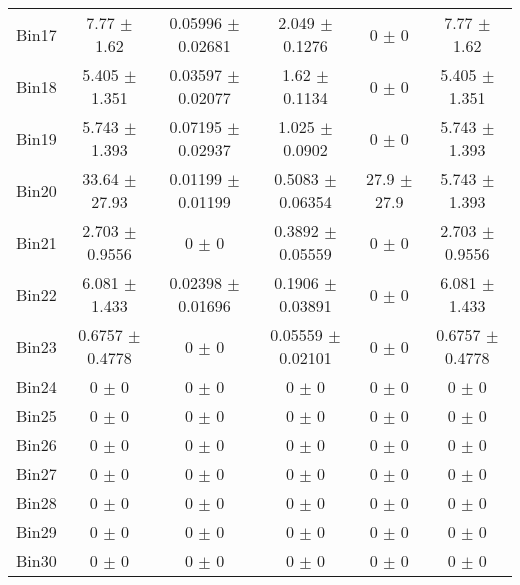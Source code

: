 \begin{tabular}{@{\extracolsep{4pt}}lccccc@{}}
     Bin17 & 7.77 $\pm$ 1.62 & 0.05996 $\pm$ 0.02681 & 2.049 $\pm$ 0.1276 & 0 $\pm$ 0 & 7.77 $\pm$ 1.62 \\ 
     Bin18 & 5.405 $\pm$ 1.351 & 0.03597 $\pm$ 0.02077 & 1.62 $\pm$ 0.1134 & 0 $\pm$ 0 & 5.405 $\pm$ 1.351 \\ 
     Bin19 & 5.743 $\pm$ 1.393 & 0.07195 $\pm$ 0.02937 & 1.025 $\pm$ 0.0902 & 0 $\pm$ 0 & 5.743 $\pm$ 1.393 \\ 
     Bin20 & 33.64 $\pm$ 27.93 & 0.01199 $\pm$ 0.01199 & 0.5083 $\pm$ 0.06354 & 27.9 $\pm$ 27.9 & 5.743 $\pm$ 1.393 \\ 
     Bin21 & 2.703 $\pm$ 0.9556 & 0 $\pm$ 0 & 0.3892 $\pm$ 0.05559 & 0 $\pm$ 0 & 2.703 $\pm$ 0.9556 \\ 
     Bin22 & 6.081 $\pm$ 1.433 & 0.02398 $\pm$ 0.01696 & 0.1906 $\pm$ 0.03891 & 0 $\pm$ 0 & 6.081 $\pm$ 1.433 \\ 
     Bin23 & 0.6757 $\pm$ 0.4778 & 0 $\pm$ 0 & 0.05559 $\pm$ 0.02101 & 0 $\pm$ 0 & 0.6757 $\pm$ 0.4778 \\ 
     Bin24 & 0 $\pm$ 0 & 0 $\pm$ 0 & 0 $\pm$ 0 & 0 $\pm$ 0 & 0 $\pm$ 0 \\ 
     Bin25 & 0 $\pm$ 0 & 0 $\pm$ 0 & 0 $\pm$ 0 & 0 $\pm$ 0 & 0 $\pm$ 0 \\ 
     Bin26 & 0 $\pm$ 0 & 0 $\pm$ 0 & 0 $\pm$ 0 & 0 $\pm$ 0 & 0 $\pm$ 0 \\ 
     Bin27 & 0 $\pm$ 0 & 0 $\pm$ 0 & 0 $\pm$ 0 & 0 $\pm$ 0 & 0 $\pm$ 0 \\ 
     Bin28 & 0 $\pm$ 0 & 0 $\pm$ 0 & 0 $\pm$ 0 & 0 $\pm$ 0 & 0 $\pm$ 0 \\ 
     Bin29 & 0 $\pm$ 0 & 0 $\pm$ 0 & 0 $\pm$ 0 & 0 $\pm$ 0 & 0 $\pm$ 0 \\ 
     Bin30 & 0 $\pm$ 0 & 0 $\pm$ 0 & 0 $\pm$ 0 & 0 $\pm$ 0 & 0 $\pm$ 0 \\ 
\hline\hline
  \end{tabular}
